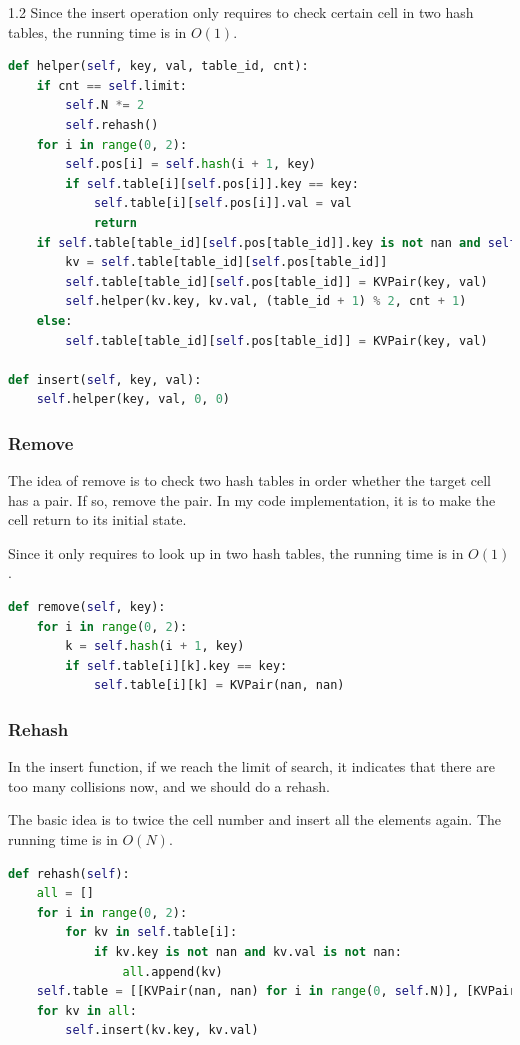 \documentclass{article}
\begin{document}
\begin{spacing}{1.2}
Since the insert operation only requires to check certain cell in two hash tables, the running time is in $O(1)$.
\begin{lstlisting}[language=Python]
def helper(self, key, val, table_id, cnt):
    if cnt == self.limit:
        self.N *= 2
        self.rehash()
    for i in range(0, 2):
        self.pos[i] = self.hash(i + 1, key)
        if self.table[i][self.pos[i]].key == key:
            self.table[i][self.pos[i]].val = val
            return
    if self.table[table_id][self.pos[table_id]].key is not nan and self.table[table_id][self.pos[table_id]].val is not nan:
        kv = self.table[table_id][self.pos[table_id]]
        self.table[table_id][self.pos[table_id]] = KVPair(key, val)
        self.helper(kv.key, kv.val, (table_id + 1) % 2, cnt + 1)
    else:
        self.table[table_id][self.pos[table_id]] = KVPair(key, val)

def insert(self, key, val):
    self.helper(key, val, 0, 0)
\end{lstlisting}

\subsubsection{Remove}
The idea of remove is to check two hash tables in order whether the target cell has a pair. If so, remove the pair. In my code implementation, it is to make the cell return to its initial state. 

Since it only requires to look up in two hash tables, the running time is in $O(1)$.
\begin{lstlisting}[language=Python]
def remove(self, key):
    for i in range(0, 2):
        k = self.hash(i + 1, key)
        if self.table[i][k].key == key:
            self.table[i][k] = KVPair(nan, nan)
\end{lstlisting}

\subsubsection{Rehash}
In the insert function, if we reach the limit of search, it indicates that there are too many collisions now, and we should do a rehash.

The basic idea is to twice the cell number and insert all the elements again. The running time is in $O(N)$.
\begin{lstlisting}[language=Python]
def rehash(self):
    all = []
    for i in range(0, 2):
        for kv in self.table[i]:
            if kv.key is not nan and kv.val is not nan:
                all.append(kv)
    self.table = [[KVPair(nan, nan) for i in range(0, self.N)], [KVPair(nan, nan) for i in range(0, self.N)]]
    for kv in all:
        self.insert(kv.key, kv.val)
\end{lstlisting}


\end{spacing}
\end{document}
